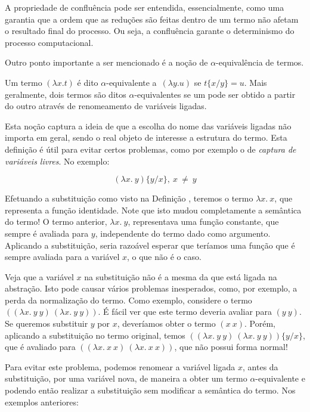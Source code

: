 A propriedade de confluência pode ser entendida, essencialmente, como uma
garantia que a ordem que as reduções são feitas dentro de um termo não afetam o
resultado final do processo. Ou seja, a confluência garante o determinismo do
processo computacional.


Outro ponto importante a ser mencionado é a noção de $\alpha$-equivalência de
termos. 

\begin{definicao}
    Um termo $(\lambda x. t)$ é dito $\alpha$-equivalente a\ $(\lambda y. u)$ se
    $ t\{x/y\} = u $. Mais geralmente, dois termos são ditos
    $\alpha$-equivalentes se um pode ser obtido a partir do outro através de
    renomeamento de variáveis ligadas.
\end{definicao}

Esta noção captura a ideia de que a escolha do nome das
variáveis ligadas não importa em geral, sendo o real objeto de interesse a
estrutura do termo. Esta definição é útil para evitar certos problemas, como por
exemplo o de \textit{captura de variáveis livres}. No exemplo:

\[ (\lambda x.\ y)\{y/x\},\ x\ \neq\ y \]

Efetuando a substituição como visto na Definição \cite{classic_subst}, teremos o
termo $\lambda x.\ x$, que representa a função identidade. Note que isto mudou
completamente a semântica do termo! O termo anterior, $\lambda x.\ y$,
representava uma função constante, que sempre é avaliada para $y$, independente
do termo dado como argumento. Aplicando a substituição, seria razoável esperar
que teríamos uma função que é sempre avaliada para a variável $x$, o que não é o
caso. 

Veja que a variável $x$ na substituição não é a mesma da que está ligada na
abstração. Isto pode causar vários problemas inesperados, como, por exemplo, a
perda da normalização do termo.  Como exemplo, considere o termo $((\lambda x.\
y\ y)\ (\lambda x.\ y\ y))$. É fácil ver que este termo deveria avaliar para
$(y\ y)$. Se queremos substituir $y$ por $x$, deveríamos obter o termo $(x\ x)$.
Porém, aplicando a substituição no termo original, temos $((\lambda x.\ y\ y)\
(\lambda x.\ y\ y))\{y/x\}$, que é avaliado para $((\lambda x.\ x\ x)\ (\lambda
x.\ x\ x))$, que não possui forma normal!

Para evitar este problema, podemos renomear a variável ligada $x$, antes da
substituição, por uma variável nova, de maneira a obter um termo
$\alpha$-equivalente e podendo então realizar a substituição sem modificar a
semântica do termo. Nos exemplos anteriores:

